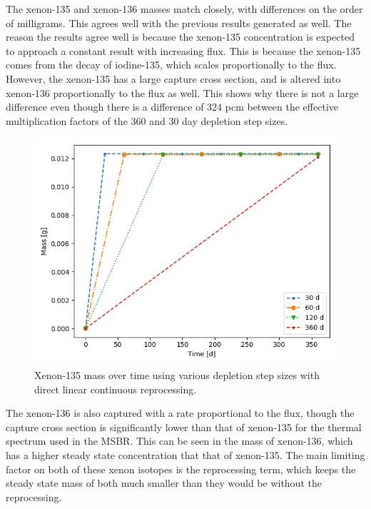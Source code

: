 The xenon-135 and xenon-136 masses match closely, with differences on the order of milligrams. This agrees well with the previous results generated as well. The reason the results agree well is because the xenon-135 concentration is expected to approach a constant result with increasing flux. This is because the xenon-135 comes from the decay of iodine-135, which scales proportionally to the flux. However, the xenon-135 has a large capture cross section, and is altered into xenon-136 proportionally to the flux as well. This shows why there is not a large difference even though there is a difference of 324 pcm between the effective multiplication factors of the 360 and 30 day depletion step sizes.

\begin{figure}[H]
  \centering
  \includegraphics[scale=0.7]{images/DL_NSTEP_Xe-135_mass-large.png}
  \caption{Xenon-135 mass over time using various depletion step sizes with direct linear continuous reprocessing.}
   \label{fig:DL-cont-xe135-2}
\end{figure}

The xenon-136 is also captured with a rate proportional to the flux, though the capture cross section is significantly lower than that of xenon-135 for the thermal spectrum used in the MSBR. This can be seen in the mass of xenon-136, which has a higher steady state concentration that that of xenon-135. The main limiting factor on both of these xenon isotopes is the reprocessing term, which keeps the steady state mass of both much smaller than they would be without the reprocessing.

